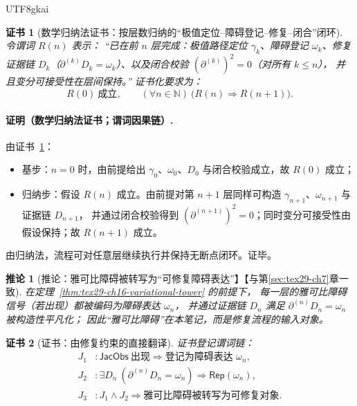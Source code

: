 \documentclass[12pt]{article}
\newtheorem{corollary}{推论}[section]
\newtheorem{Certificate}{证书}[section]
\newcommand{\NN}{\mathbb{N}}
\newcommand{\KouJing}{\texorpdfstring{表述约定}{表述约定}}
\begin{document}
\begin{CJK*}{UTF8}{gkai}
\begin{Certificate}[数学归纳法证书：按层数归纳的“极值定位--障碍登记--修复--闭合”闭环]
\label{cert:tex29-ch16-variational-tower}
令谓词 $R(n)$ 表示：
“已在前 $n$ 层完成：极值路径定位 $\gamma_k$、障碍登记 $\omega_k$、修复证据链 $D_k$（$\partial^{(k)}D_k=\omega_k$）、以及闭合校验 $(\partial^{(k)})
  ^2=0$（对所有 $k\le n$），
并且变分可接受性在层间保持。”
证书化要求为：
\[
  R(0)\ \text{成立},\qquad (\forall n\in\NN)\ \bigl(R(n)\Rightarrow R(n+1)\bigr).
\]
\end{Certificate}

\paragraph{证明（数学归纳法证书；谓词因果链）.}
由证书~\ref{cert:tex29-ch16-variational-tower}：
\begin{itemize}
  \item 基步：$n=0$ 时，由前提给出 $\gamma_0$、$\omega_0$、$D_0$ 与闭合校验成立，故 $R(0)$ 成立；
  \item 归纳步：假设 $R(n)$ 成立。由前提对第 $n+1$ 层同样可构造 $\gamma_{n+1}$、$\omega_{n+1}$ 与证据链 $D_{n+1}$，
  并通过闭合校验得到 $(\partial^{(n+1)})^2=0$；同时变分可接受性由假设保持；故 $R(n+1)$ 成立。
\end{itemize}
由归纳法，流程可对任意层继续执行并保持无断点闭环。证毕。

\begin{corollary}[推论：雅可比障碍被转写为“可修复障碍表达”】【与第\ref{sec:tex29-ch7}章一致]
\label{cor:tex29-ch16-jacobi-to-rep}
在定理~\ref{thm:tex29-ch16-variational-tower} 的前提下，
每一层的雅可比障碍信号（若出现）都被编码为障碍表达 $\omega_n$，
并通过证据链 $D_n$ 满足 $\partial^{(n)}D_n=\omega_n$ 被构造性平凡化；
因此“雅可比障碍”在本笔记，而是修复流程的输入对象。
\end{corollary}

\begin{Certificate}[证书：由修复约束的直接翻译]
\label{cert:tex29-ch16-jacobi-to-rep}
证书登记谓词链：
\[
\begin{aligned}
  J_1 &: \mathsf{JacObs}\ \text{出现}\Rightarrow \text{登记为障碍表达 }\omega_n,\\
  J_2 &: \exists D_n\ (\partial^{(n)}D_n=\omega_n)\Rightarrow \mathsf{Rep}(\omega_n),\\
  J_3 &: J_1\wedge J_2\Rightarrow \text{雅可比障碍被转写为可修复对象}.
\end{aligned}
\]
\end{Certificate}


\end{CJK*}
\end{document}
